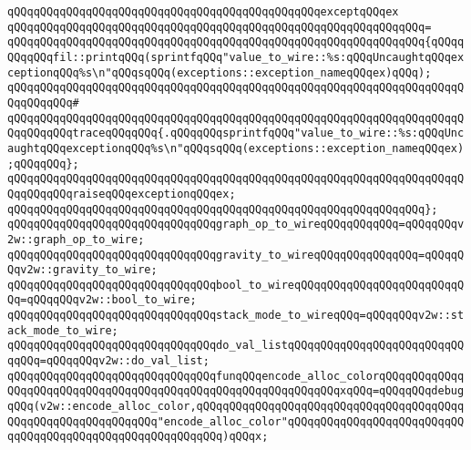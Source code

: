 \verb|qQQqqQQqqQQqqQQqqQQqqQQqqQQqqQQqqQQqqQQqqQQqqQQqexceptqQQqex|\newline
\verb|qQQqqQQqqQQqqQQqqQQqqQQqqQQqqQQqqQQqqQQqqQQqqQQqqQQqqQQqqQQqqQQq=|\newline
\verb|qQQqqQQqqQQqqQQqqQQqqQQqqQQqqQQqqQQqqQQqqQQqqQQqqQQqqQQqqQQqqQQq{qQQqqQQqqQQqfil::printqQQq(sprintfqQQq"value_to_wire::%s:qQQqUncaughtqQQqexceptionqQQq%s\n"qQQqsqQQq(exceptions::exception_nameqQQqex)qQQq);|\newline
\verb|qQQqqQQqqQQqqQQqqQQqqQQqqQQqqQQqqQQqqQQqqQQqqQQqqQQqqQQqqQQqqQQqqQQqqQQqqQQqqQQq#|\newline
\verb|qQQqqQQqqQQqqQQqqQQqqQQqqQQqqQQqqQQqqQQqqQQqqQQqqQQqqQQqqQQqqQQqqQQqqQQqqQQqqQQqtraceqQQqqQQq{.qQQqqQQqsprintfqQQq"value_to_wire::%s:qQQqUncaughtqQQqexceptionqQQq%s\n"qQQqsqQQq(exceptions::exception_nameqQQqex);qQQqqQQq};|\newline
\newline
\verb|qQQqqQQqqQQqqQQqqQQqqQQqqQQqqQQqqQQqqQQqqQQqqQQqqQQqqQQqqQQqqQQqqQQqqQQqqQQqqQQqraiseqQQqexceptionqQQqex;|\newline
\verb|qQQqqQQqqQQqqQQqqQQqqQQqqQQqqQQqqQQqqQQqqQQqqQQqqQQqqQQqqQQqqQQq};|\newline
\newline
\newline
\newline
\newline
\newline
\newline
\verb|qQQqqQQqqQQqqQQqqQQqqQQqqQQqqQQqgraph_op_to_wireqQQqqQQqqQQq=qQQqqQQqv2w::graph_op_to_wire;|\newline
\verb|qQQqqQQqqQQqqQQqqQQqqQQqqQQqqQQqgravity_to_wireqQQqqQQqqQQqqQQq=qQQqqQQqv2w::gravity_to_wire;|\newline
\verb|qQQqqQQqqQQqqQQqqQQqqQQqqQQqqQQqbool_to_wireqQQqqQQqqQQqqQQqqQQqqQQqqQQq=qQQqqQQqv2w::bool_to_wire;|\newline
\verb|qQQqqQQqqQQqqQQqqQQqqQQqqQQqqQQqstack_mode_to_wireqQQq=qQQqqQQqv2w::stack_mode_to_wire;|\newline
\verb|qQQqqQQqqQQqqQQqqQQqqQQqqQQqqQQqdo_val_listqQQqqQQqqQQqqQQqqQQqqQQqqQQqqQQq=qQQqqQQqv2w::do_val_list;|\newline
\newline
\verb|qQQqqQQqqQQqqQQqqQQqqQQqqQQqqQQqfunqQQqencode_alloc_colorqQQqqQQqqQQqqQQqqQQqqQQqqQQqqQQqqQQqqQQqqQQqqQQqqQQqqQQqqQQqqQQqxqQQq=qQQqqQQqdebugqQQq(v2w::encode_alloc_color,qQQqqQQqqQQqqQQqqQQqqQQqqQQqqQQqqQQqqQQqqQQqqQQqqQQqqQQqqQQqqQQq"encode_alloc_color"qQQqqQQqqQQqqQQqqQQqqQQqqQQqqQQqqQQqqQQqqQQqqQQqqQQqqQQqqQQq)qQQqx;|\newline

